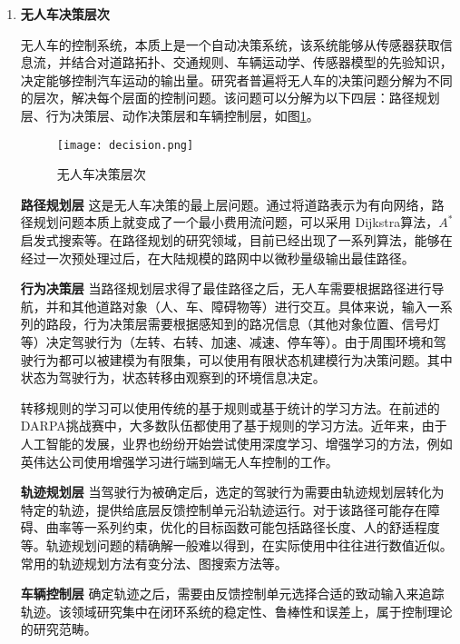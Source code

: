 \begin{enumerate}[wide=\parindent]
\item \textbf{无人车决策层次}
\label{sec:hierarchy}

无人车的控制系统，本质上是一个自动决策系统，该系统能够从传感器获取信息流，并结合对道路拓扑、交通规则、车辆运动学、传感器模型的先验知识，决定能够控制汽车运动的输出量。研究者普遍将无人车的决策问题分解为不同的层次，解决每个层面的控制问题。该问题可以分解为以下四层：路径规划层、行为决策层、动作决策层和车辆控制层\cite{paden2016survey}，如图\ref{fig:decision0}。

\begin{figure}[htbp]
\centering
\texttt{[image: decision.png]}
\caption{无人车决策层次\cite{paden2016survey}}
\label{fig:decision0}
\end{figure}

\textbf{路径规划层 } 这是无人车决策的最上层问题。通过将道路表示为有向网络，路径规划问题本质上就变成了一个最小费用流问题，可以采用 Dijkstra算法\cite{Dijkstra1959A}，$A^*$启发式搜索\cite{Nilsson1969A}等。在路径规划的研究领域，目前已经出现了一系列算法，能够在经过一次预处理过后，在大陆规模的路网中以微秒量级输出最佳路径\cite{Goldberg2003Computing,Geisberger2012Exact}。

\textbf{行为决策层 } 当路径规划层求得了最佳路径之后，无人车需要根据路径进行导航，并和其他道路对象（人、车、障碍物等）进行交互。具体来说，输入一系列的路段，行为决策层需要根据感知到的路况信息（其他对象位置、信号灯等）决定驾驶行为（左转、右转、加速、减速、停车等）。由于周围环境和驾驶行为都可以被建模为有限集，可以使用有限状态机建模行为决策问题。其中状态为驾驶行为，状态转移由观察到的环境信息决定。

转移规则的学习可以使用传统的基于规则或基于统计的学习方法。在前述的 DARPA挑战赛中，大多数队伍都使用了基于规则的学习方法\cite{Buehler2009The}。近年来，由于人工智能的发展，业界也纷纷开始尝试使用深度学习、增强学习的方法，例如英伟达公司使用增强学习进行端到端无人车控制的工作\cite{Bojarski2016End}。

\textbf{轨迹规划层 } 当驾驶行为被确定后，选定的驾驶行为需要由轨迹规划层转化为特定的轨迹，提供给底层反馈控制单元沿轨迹运行。对于该路径可能存在障碍、曲率等一系列约束，优化的目标函数可能包括路径长度、人的舒适程度等。轨迹规划问题的精确解一般难以得到，在实际使用中往往进行数值近似。常用的轨迹规划方法有变分法、图搜索方法等。

\textbf{车辆控制层 } 确定轨迹之后，需要由反馈控制单元选择合适的致动输入来追踪轨迹。该领域研究集中在闭环系统的稳定性、鲁棒性和误差上，属于控制理论的研究范畴。


\end{enumerate}
